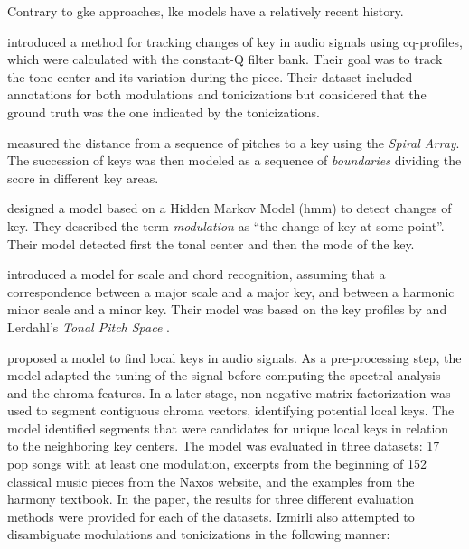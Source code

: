 


Contrary to \gls{gke} approaches, \gls{lke} models have a
relatively recent history.

\textcite{purwins2000new} introduced a method for tracking
changes of key in audio signals using cq-profiles, which
were calculated with the constant-Q filter bank. Their goal
was to track the tone center and its variation during the
piece. Their dataset included annotations for both
modulations and tonicizations but considered that the ground
truth was the one indicated by the tonicizations.

\textcite{chew2002spiral} measured the distance from a
sequence of pitches to a key using the \emph{Spiral Array}.
The succession of keys was then modeled as a sequence of
\emph{boundaries} dividing the score in different key areas.

\textcite{chai2005detection} designed a model based on a
Hidden Markov Model (\gls{hmm}) to detect changes of key.
They described the term \emph{modulation} as ``the change of
key at some point''. Their model detected first the tonal
center and then the mode of the key.

\textcite{catteau2007probabilistic} introduced a model for
scale and chord recognition, assuming that a correspondence
between a major scale and a major key, and between a
harmonic minor scale and a minor key. Their model was based
on the key profiles by \textcite{temperley1999whats} and
Lerdahl's \emph{Tonal Pitch Space}
\parencite{lerdahl2005tonal}.

\textcite{izmirli2007localized} proposed a model to find
local keys in audio signals. As a pre-processing step, the
model adapted the tuning of the signal before computing the
spectral analysis and the chroma features. In a later stage,
non-negative matrix factorization was used to segment
contiguous chroma vectors, identifying potential local keys.
The model identified segments that were candidates for
unique local keys in relation to the neighboring key
centers. The model was evaluated in three datasets: 17 pop
songs with at least one modulation, excerpts from the
beginning of 152 classical music pieces from the Naxos
website, and the examples from the
\textcite{kostka1984tonal} harmony textbook. In the paper,
the results for three different evaluation methods were
provided for each of the datasets. Izmirli also attempted to
disambiguate modulations and tonicizations in the following
manner:

